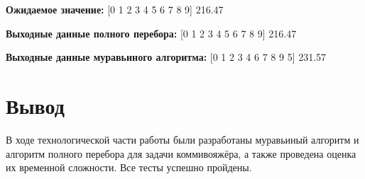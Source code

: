 \textbf{Ожидаемое значение:} [0 1 2 3 4 5 6 7 8 9] 216.47


\textbf{Выходные данные полного перебора:} [0 1 2 3 4 5 6 7 8 9] 216.47


\textbf{Выходные данные муравьиного алгоритма:} [0 1 2 3 4 6 7 8 9 5] 231.57

\section*{Вывод}

В ходе технологической части работы были разработаны муравьиный алгоритм и алгоритм полного перебора для задачи коммивояжёра, а также проведена оценка их временной сложности. Все тесты успешно пройдены.

\clearpage

